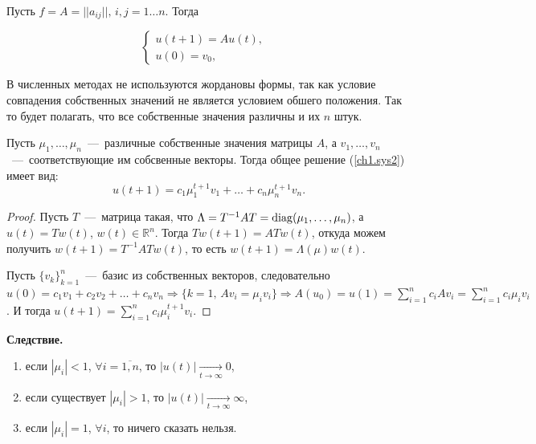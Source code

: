 Пусть $f = A = ||a_{ij}||, \,i, j = 1\ldots n$. Тогда

\begin{equation}
\label{ch1.sys2}
\begin{cases}
u(t+1) = A u(t),&\\
u(0) = v_0,
\end{cases}
\end{equation}

В численных методах не используются жордановы формы, так как условие совпадения собственных значений не является условием обшего положения. Так то будет полагать, что все собственные значения различны и их $n$ штук.
\begin{assertion}
Пусть $\mu_1, \ldots, \mu_n$~---~различные собственные значения матрицы $A$, а $v_1, \ldots , v_n$~---~соответствующие им собсвенные векторы. Тогда общее решение (\ref{ch1.sys2}) имеет вид:
\begin{equation*}
u(t+1) = c_1 \mu_1^{t+1} v_1 + \ldots + c_n \mu_n^{t+1} v_n.
\end{equation*}
\end{assertion}
\begin{proof}
Пусть $T$~---~матрица такая, что $\Lambda = T^{-1} A T = \operatorname{diag}(\mu_1, \ldots, \mu_n)$, а $u(t) = Tw(t)$, $w(t) \in \mathbb{R}^n$. Тогда $Tw(t+1) = ATw(t)$, откуда можем получить $w(t+1) = T^{-1} A  T w(t)$, то есть $w(t+1) = \Lambda(\mu)w(t)$.

Пусть $\{v_k\}_{k=1}^n$~---~базис из собственных векторов, следовательно $u(0) = c_1 v_1 + c_2 v_2 + \ldots + c_n v_n \Longrightarrow \{k=1, \, Av_i = \mu_i v_i\} \Longrightarrow A(u_0) = u(1) = \sum \limits_{i=1}^n c_i A v_i = \sum \limits_{i=1}^n c_i \mu_i v_i$. И тогда $u(t+1) = \sum \limits_{i=1}^n c_i \mu_i^{t+1} v_i$.
\end{proof}

\textbf{Следствие.}
\begin{enumerate}

\item если $|\mu_i|<1$, $\forall i = \overline{1, n}$, то $|u(t)| \underset{t \to \infty}\longrightarrow 0$,

\item если существует $|\mu_i|>1$, то $|u(t)| \underset{t \to \infty}\longrightarrow \infty$,

\item если $|\mu_i| = 1$, $\forall i$, то ничего сказать нельзя.

\end{enumerate}

